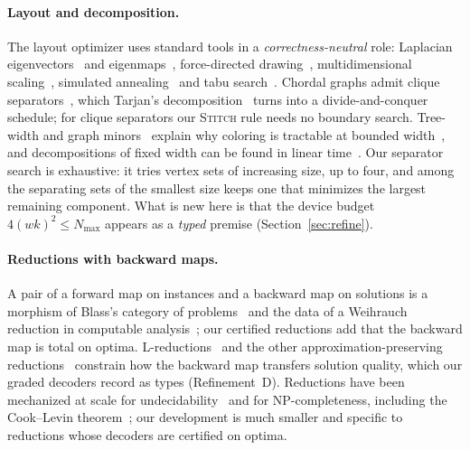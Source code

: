 \documentclass[a4paper,fleqn]{cas-sc}
\newcommand{\Nmax}{N_{\max}}
\newcommand{\rn}[1]{\textup{\textsc{\footnotesize #1}}}
\begin{document}
\paragraph{Layout and decomposition.} The layout optimizer uses standard tools in a
\emph{correctness-neutral} role: Laplacian eigenvectors~\cite{Chung1997,Fiedler1973}
and eigenmaps~\cite{Belkin2001}, force-directed drawing~\cite{Fruchterman1991},
multidimensional scaling~\cite{Kruskal1964}, simulated annealing~\cite{Kirkpatrick1983} and tabu search~\cite{Glover1997}. Chordal
graphs admit clique separators~\cite{Dirac1961}, which Tarjan's
decomposition~\cite{Tarjan1985} turns into a divide-and-conquer schedule; for clique
separators our \rn{Stitch} rule needs no boundary search. Tree-width and graph
minors~\cite{RobertsonSeymour1986} explain why coloring is tractable at bounded
width~\cite{ArnborgProskurowski1989}, and decompositions of fixed width can be found in
linear time~\cite{Bodlaender1996}. Our separator search is exhaustive: it tries
vertex sets of increasing size, up to four, and among the separating sets of the
smallest size keeps one that minimizes the largest remaining component. What is new here is that the device budget
$4(wk)^2\le\Nmax$ appears as a \emph{typed} premise (Section~\ref{sec:refine}).

\paragraph{Reductions with backward maps.} A pair of a forward map on instances and a
backward map on solutions is a morphism of Blass's category of
problems~\cite{Blass1995} and the data of a Weihrauch reduction in computable
analysis~\cite{BrattkaGherardi2011}; our certified reductions add that the backward
map is total on optima. L-reductions~\cite{PapadimitriouYannakakis1991} and the other
approximation-preserving reductions~\cite{Crescenzi1997} constrain how the backward
map transfers solution quality, which our graded decoders record as types
(Refinement~D). Reductions have been mechanized at scale for
undecidability~\cite{Forster2020} and for NP-completeness, including the Cook--Levin
theorem~\cite{GaeherKunze2021}; our development is much smaller and specific to
reductions whose decoders are certified on optima.
\end{document}
